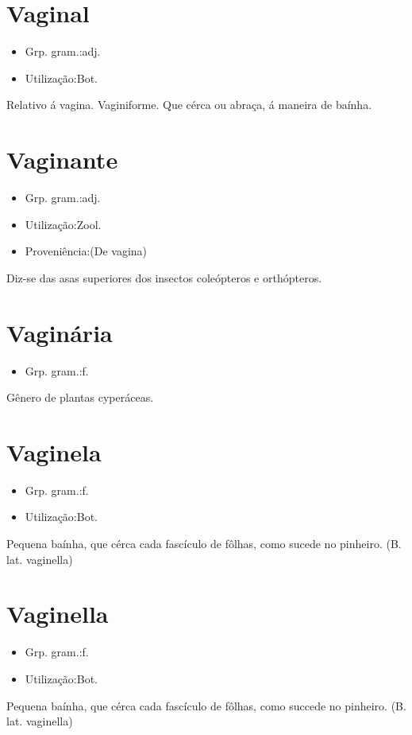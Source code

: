 \documentclass{article}
\begin{document}
\section{Vaginal}
\begin{itemize}
\item {Grp. gram.:adj.}
\end{itemize}
\begin{itemize}
\item {Utilização:Bot.}
\end{itemize}
Relativo á vagina.
Vaginiforme.
Que cérca ou abraça, á maneira de baínha.
\section{Vaginante}
\begin{itemize}
\item {Grp. gram.:adj.}
\end{itemize}
\begin{itemize}
\item {Utilização:Zool.}
\end{itemize}
\begin{itemize}
\item {Proveniência:(De \textunderscore vagina\textunderscore )}
\end{itemize}
Diz-se das asas superiores dos insectos coleópteros e orthópteros.
\section{Vaginária}
\begin{itemize}
\item {Grp. gram.:f.}
\end{itemize}
Gênero de plantas cyperáceas.
\section{Vaginela}
\begin{itemize}
\item {Grp. gram.:f.}
\end{itemize}
\begin{itemize}
\item {Utilização:Bot.}
\end{itemize}
Pequena baínha, que cérca cada fascículo de fôlhas, como sucede no pinheiro.
(B. lat. \textunderscore vaginella\textunderscore )
\section{Vaginella}
\begin{itemize}
\item {Grp. gram.:f.}
\end{itemize}
\begin{itemize}
\item {Utilização:Bot.}
\end{itemize}
Pequena baínha, que cérca cada fascículo de fôlhas, como succede no pinheiro.
(B. lat. \textunderscore vaginella\textunderscore )
\end{document}
